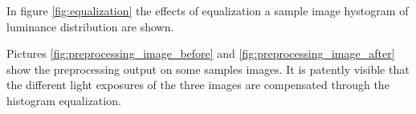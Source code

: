     \par{
        In figure \ref{fig:equalization} the effects of equalization a sample image hystogram of luminance distribution are shown.
    }
    \par{
        Pictures \ref{fig:preprocessing_image_before} and \ref{fig:preprocessing_image_after} show the preprocessing output on some samples images. It is patently visible that the different light exposures of the three images are compensated through the histogram equalization.
    }
